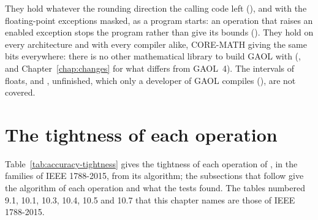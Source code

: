 \documentclass[12pt,a4paper,twoside,openright]{book}
\begin{document}
\medskip
They hold whatever the rounding direction the calling code left
(), and with the floating-point
exceptions masked, as a program starts: an operation that raises an enabled
exception stops the program rather than give its bounds
(). They hold on every architecture and with every
compiler alike, CORE-MATH giving the same bits everywhere: there is no other
mathematical library to build GAOL with (, and
Chapter~\ref{chap:changes} for what differs from GAOL~4). The intervals of
floats,  and , unfinished,
which only a developer of GAOL compiles (), are
not covered.

\section{The tightness of each operation}\label{sec:accuracy-table}
%

Table~\ref{tab:accuracy-tightness} gives the tightness of each operation of
, in the families of IEEE 1788-2015, from its algorithm; the
subsections that follow give the algorithm of each operation and what the
tests found. The tables numbered 9.1, 10.1, 10.3, 10.4, 10.5 and 10.7 that this
chapter names are those of IEEE 1788-2015.
\end{document}

